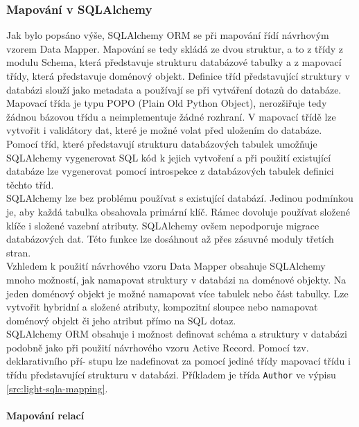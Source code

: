 \documentclass[ing,male,java,dept456]{diploma}						%
\begin{document}
\subsubsection{Mapování v SQLAlchemy}

Jak bylo popsáno výše, SQLAlchemy ORM se při mapování řídí návrhovým vzorem Data Mapper. Mapování se tedy skládá ze dvou struktur, a to z třídy z modulu Schema, která představuje strukturu databázové tabulky a z mapovací třídy, která představuje doménový objekt. Definice tříd představující struktury v databázi slouží jako metadata a používají se při vytváření dotazů do databáze. Mapovací třída je typu POPO (Plain Old Python Object), nerozšiřuje tedy žádnou bázovou třídu a neimplementuje žádné rozhraní. V mapovací třídě lze vytvořit i validátory dat, které je možné volat před uložením do databáze. \\
Pomocí tříd, které představují strukturu databázových tabulek umožňuje SQLAlchemy vygenerovat SQL kód k jejich vytvoření a při použití existující databáze lze vygenerovat pomocí introspekce z databázových tabulek definici těchto tříd. \\
SQLAlchemy lze bez problému používat s existující databází. Jedinou podmínkou je, aby každá tabulka obsahovala primární klíč. Rámec dovoluje používat složené klíče i složené vazební atributy. SQLAlchemy ovšem nepodporuje migrace databázových dat. Této funkce lze dosáhnout až přes zásuvné moduly třetích stran. \\
Vzhledem k použití návrhového vzoru Data Mapper obsahuje SQLAlchemy mnoho možností, jak namapovat struktury v databázi na doménové objekty. Na jeden doménový objekt je možné namapovat více tabulek nebo část tabulky. Lze vytvořit hybridní a složené atributy, kompozitní sloupce nebo namapovat doménový objekt či jeho atribut přímo na SQL dotaz. \\
SQLAlchemy ORM obsahuje i možnost definovat schéma a struktury v databázi podobně jako při použití návrhového vzoru Active Record. Pomocí tzv. deklarativního pří- stupu lze nadefinovat za pomocí jediné třídy mapovací třídu i třídu představující strukturu v databázi. Příkladem je třída \lstinline[style=inlinepython]|Author| ve výpisu \ref{src:light-sqla-mapping}.

\paragraph{Mapování relací}
\end{document}

